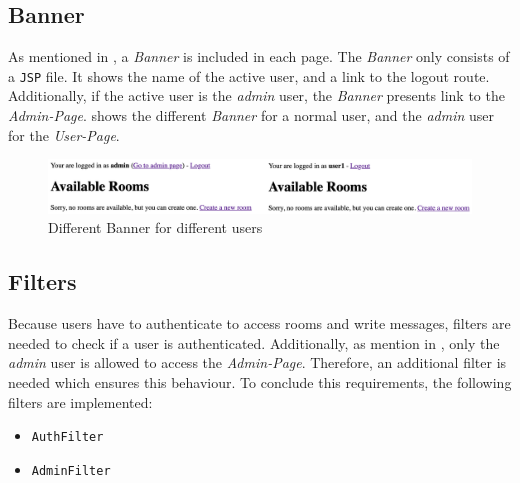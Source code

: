 \subsection{Banner}\label{subsec:04_impl_banner}
As mentioned in , a \textit{Banner} is included in each page.
The \textit{Banner} only consists of a \texttt{JSP} file. It shows the name of the active user, and a link to the logout route.
Additionally, if the active user is the \textit{admin} user, the \textit{Banner} presents link to the \textit{Admin-Page}.
 shows the different \textit{Banner} for a normal user, and the \textit{admin} user for the \textit{User-Page}.
\begin{figure}[h]
\centering
\includegraphics[scale=0.2]{images/03_impl/banner/banner}
\caption{Different Banner for different users}
\label{fig:04_impl_banner_banner}
\end{figure}


\subsection{Filters}\label{subsec:03_impl_filters}
Because users have to authenticate to access rooms and write messages, filters are needed to check if a user is authenticated.
Additionally, as mention in , only the \textit{admin} user is allowed to access the \textit{Admin-Page}. Therefore, an additional filter is needed which ensures this behaviour.
To conclude this requirements, the following filters are implemented:
\begin{itemize}
\item \texttt{AuthFilter}
\item \texttt{AdminFilter}
\end{itemize}


